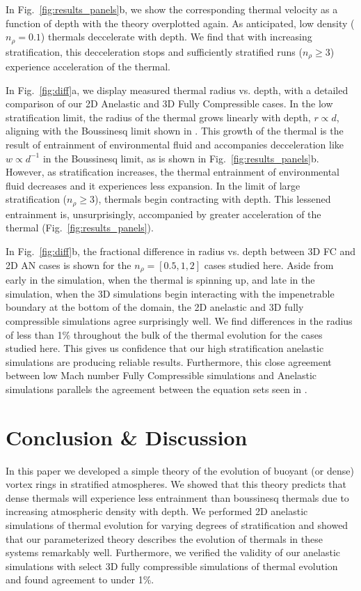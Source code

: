 \documentclass[twocolumn, amsmath, amsfonts, amssymb, trackchanges]{aastex62}
\begin{document}
In Fig.~\ref{fig:results_panels}b, we show the corresponding thermal velocity as a function of depth with the theory overplotted again.
As anticipated, low density ($n_\rho = 0.1$) thermals deccelerate with depth.
We find that with increasing stratification, this decceleration stops and sufficiently stratified runs ($n_\rho \geq 3$) experience acceleration of the thermal.

In Fig.~\ref{fig:diff}a, we display measured thermal radius vs. depth, with a detailed comparison of our 2D Anelastic and 3D Fully Compressible cases. 
In the low stratification limit, the radius of the thermal grows linearly with depth, $r \propto d$, aligning with the Boussinesq limit shown in \citet{lecoanet&jeevanjee2018}.
This growth of the thermal is the result of entrainment of environmental fluid and accompanies decceleration like $w \propto d^{-1}$ in the Boussinesq limit, as is shown in Fig.~\ref{fig:results_panels}b.
However, as stratification increases, the thermal entrainment of environmental fluid decreases and it experiences less expansion.
In the limit of large stratification ($n_\rho \geq 3$), thermals begin contracting with depth.
This lessened entrainment is, unsurprisingly, accompanied by greater acceleration of the thermal (Fig.~\ref{fig:results_panels}).


In Fig.~\ref{fig:diff}b, the fractional difference in radius vs. depth between 3D FC and 2D AN cases is shown for the $n_\rho = [0.5, 1, 2]$ cases studied here. 
Aside from early in the simulation, when the thermal is spinning up, and late in the simulation, when the 3D simulations begin interacting with the impenetrable boundary at the bottom of the domain, the 2D anelastic and 3D fully compressible simulations agree surprisingly well.
We find differences in the radius of less than 1\% throughout the bulk of the thermal evolution for the cases studied here.
This gives us confidence that our high stratification anelastic simulations are producing reliable results.
Furthermore, this close agreement between low Mach number Fully Compressible simulations and Anelastic simulations parallels the agreement between the equation sets seen in \citet{lecoanet&all2014}.

\section{Conclusion \& Discussion}
\label{sec:discussion}
In this paper we developed a simple theory of the evolution of buoyant (or dense) vortex rings in stratified atmospheres.
We showed that this theory predicts that dense thermals will experience less entrainment than boussinesq thermals due to increasing atmospheric density with depth.
We performed 2D anelastic simulations of thermal evolution for varying degrees of stratification and showed that our parameterized theory describes the evolution of thermals in these systems remarkably well.
Furthermore, we verified the validity of our anelastic simulations with select 3D fully compressible simulations of thermal evolution and found agreement to under 1\%.
\end{document}
